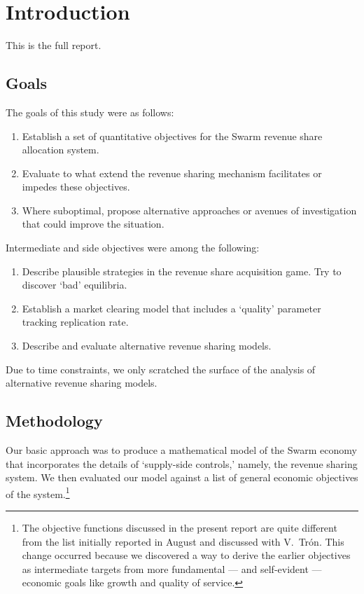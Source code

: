 \maketitle
\section{Introduction}

This is the full report.

\subsection{Goals}

The goals of this study were as follows:
\begin{enumerate}
  \item Establish a set of quantitative objectives for the Swarm revenue share allocation system.
  \item Evaluate to what extend the revenue sharing mechanism facilitates or impedes these objectives.
  \item Where suboptimal, propose alternative approaches or avenues of investigation that could improve the situation.
\end{enumerate}
Intermediate and side objectives were among the following:
\begin{enumerate}
  \item Describe plausible strategies in the revenue share acquisition game. Try to discover `bad' equilibria.
  \item Establish a market clearing model that includes a `quality' parameter tracking replication rate.
  \item Describe and evaluate alternative revenue sharing models.
\end{enumerate}

Due to time constraints, we only scratched the surface of the analysis of alternative revenue sharing models.

\subsection{Methodology}
%
Our basic approach was to produce a mathematical model of the Swarm economy that incorporates the details of `supply-side controls,' namely, the revenue sharing system.
%
We then evaluated our model against a list of general economic objectives of the system.\footnote{The objective functions discussed in the present report are quite different from the list initially reported in August and discussed with V.~Tr\'{o}n.
%
This change occurred because we discovered a way to derive the earlier objectives as intermediate targets from more fundamental --- and self-evident --- economic goals like growth and quality of service.}


